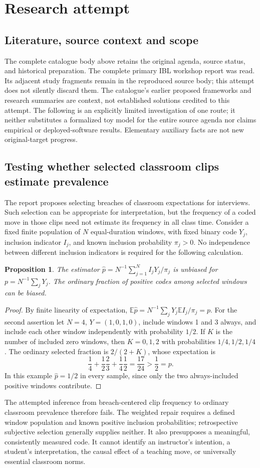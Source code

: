 \documentclass[11pt]{article}
\newtheorem{proposition}{Proposition}
\begin{document}
\section{Research attempt}
\subsection{Literature, source context and scope}
The complete catalogue body above retains the original agenda, source status, and historical preparation. The complete primary IBL workshop report was read. Its adjacent study fragments remain in the reproduced source body; this attempt does not silently discard them. The catalogue's earlier proposed frameworks and research summaries are context, not established solutions credited to this attempt. The following is an explicitly limited investigation of one route; it neither substitutes a formalized toy model for the entire source agenda nor claims empirical or deployed-software results. Elementary auxiliary facts are not new original-target progress.

\subsection{Testing whether selected classroom clips estimate prevalence}
The report proposes selecting breaches of classroom expectations for interviews. Such selection can be appropriate for interpretation, but the frequency of a coded move in those clips need not estimate its frequency in all class time. Consider a fixed finite population of $N$ equal-duration windows, with fixed binary code $Y_j$, inclusion indicator $I_j$, and known inclusion probability $\pi_j>0$. No independence between different inclusion indicators is required for the following calculation.
\begin{proposition}
The estimator $\widehat p=N^{-1}\sum_{j=1}^N I_jY_j/\pi_j$ is unbiased for $p=N^{-1}\sum_jY_j$. The ordinary fraction of positive codes among selected windows can be biased.
\end{proposition}
\begin{proof}
By finite linearity of expectation, $\mathbb E\widehat p=N^{-1}\sum_jY_j\mathbb E I_j/\pi_j=p$.
For the second assertion let $N=4$, $Y=(1,0,1,0)$, include windows 1 and 3 always, and include each other window independently with probability $1/2$. If $K$ is the number of included zero windows, then $K=0,1,2$ with probabilities $1/4,1/2,1/4$. The ordinary selected fraction is $2/(2+K)$, whose expectation is
\[
\frac14+\frac12\frac23+\frac14\frac12=\frac{17}{24}>\frac12=p.
\]
In this example $\widehat p=1/2$ in every sample, since only the two always-included positive windows contribute.
\end{proof}
The attempted inference from breach-centered clip frequency to ordinary classroom prevalence therefore fails. The weighted repair requires a defined window population and known positive inclusion probabilities; retrospective subjective selection generally supplies neither. It also presupposes a meaningful, consistently measured code. It cannot identify an instructor's intention, a student's interpretation, the causal effect of a teaching move, or universally essential classroom norms.
\end{document}
